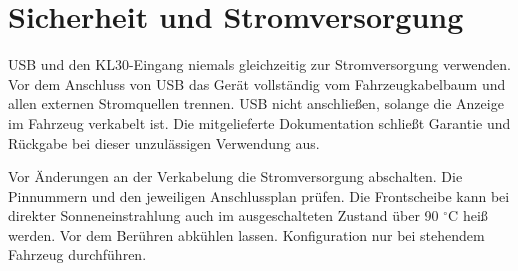 \chapter{Sicherheit und Stromversorgung}
USB und den KL30-Eingang niemals gleichzeitig zur Stromversorgung verwenden. Vor dem Anschluss von USB das Gerät vollständig vom Fahrzeugkabelbaum und allen externen Stromquellen trennen. USB nicht anschließen, solange die Anzeige im Fahrzeug verkabelt ist. Die mitgelieferte Dokumentation schließt Garantie und Rückgabe bei dieser unzulässigen Verwendung aus.

Vor Änderungen an der Verkabelung die Stromversorgung abschalten. Die Pinnummern und den jeweiligen Anschlussplan prüfen. Die Frontscheibe kann bei direkter Sonneneinstrahlung auch im ausgeschalteten Zustand über 90 $^\circ$C heiß werden. Vor dem Berühren abkühlen lassen. Konfiguration nur bei stehendem Fahrzeug durchführen.
